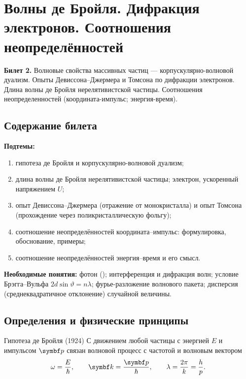 \chapter[Волны де Бройля. Дифракция электронов. Соотношения неопределённостей]%
        {Волны де Бройля. Дифракция электронов. Соотношения неопределённостей}
\label{t:02}

\begin{qbox}
\textbf{Билет 2.} Волновые свойства массивных частиц — корпускулярно-волновой дуализм.
Опыты Девиссона--Джермера и Томсона по дифракции электронов. Длина волны де Бройля
нерелятивистской частицы. Соотношения неопределенностей (координата-импульс; энергия-время).
\end{qbox}

\section{Содержание билета}

\textbf{Подтемы:}
\begin{enumerate}
 \item гипотеза де Бройля и корпускулярно-волновой дуализм;
 \item длина волны де Бройля нерелятивистской частицы; электрон, ускоренный напряжением $U$;
 \item опыт Девиссона--Джермера (отражение от монокристалла) и опыт Томсона (прохождение через поликристаллическую фольгу);
 \item соотношение неопределённостей координата--импульс: формулировка, обоснование, примеры;
 \item соотношение неопределённостей энергия--время и его смысл.
\end{enumerate}

\textbf{Необходимые понятия:} фотон (); интерференция и дифракция волн;
условие Брэгга--Вульфа $2d\sin\vartheta=n\lambda$; фурье-разложение волнового пакета;
дисперсия (среднеквадратичное отклонение) случайной величины.

\section{Определения и физические принципы}

\begin{principle}{Гипотеза де Бройля (1924)}
С движением любой частицы с энергией $E$ и импульсом $\vect p$ связан волновой процесс
с частотой и волновым вектором
\begin{equation}\label{eq:2:dB}
 \omega=\frac{E}{\hbar},\qquad \vect k=\frac{\vect p}{\hbar},\qquad
 \lambda=\frac{2\pi}{k}=\frac{h}{p}.
\end{equation}
\end{principle}

